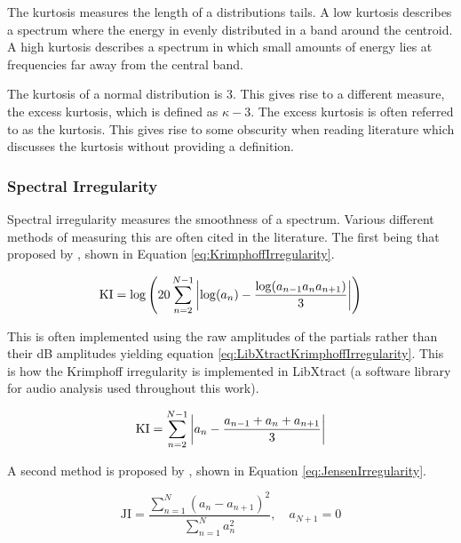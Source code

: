 			The kurtosis measures the length of a distributions tails. A low kurtosis describes a spectrum where
			the energy in evenly distributed in a band around the centroid. A high kurtosis describes a spectrum
			in which small amounts of energy lies at frequencies far away from the central band.

			The kurtosis of a normal distribution is 3. This gives rise to a different measure, the excess
			kurtosis, which is defined as $\kappa - 3$. The excess kurtosis is often referred to as the
			kurtosis. This gives rise to some obscurity when reading literature which discusses the kurtosis
			without providing a definition.

		\subsubsection*{Spectral Irregularity}
			Spectral irregularity measures the smoothness of a spectrum. Various different methods of measuring
			this are often cited in the literature. The first being that proposed by
			\citet{krimphoff1994caracterisation}, shown in Equation \ref{eq:KrimphoffIrregularity}.

			\begin{equation}
				\textrm{KI} = \log \left( 20 \sum_{n = 2}^{N - 1}
							  \left|\log(a_{n}) - \frac{\log(a_{n-1}a_{n}a_{n+1})}{3}\right|
						   \right)
				\label{eq:KrimphoffIrregularity}
			\end{equation}

			This is often implemented using the raw amplitudes of the partials rather than their dB amplitudes
			yielding equation \ref{eq:LibXtractKrimphoffIrregularity}. This is how the Krimphoff irregularity is
			implemented in LibXtract \citep{bullock2007libxtract} (a software library for audio analysis used
			throughout this work).

			\begin{equation}
				\textrm{KI} = \sum_{n = 2}^{N - 1}
						  \left|a_{n} - \frac{a_{n-1} + a_{n} + a_{n+1}}{3}\right|
				\label{eq:LibXtractKrimphoffIrregularity}
			\end{equation}

			A second method is proposed by \citet{jensen1999timbre}, shown in Equation
			\ref{eq:JensenIrregularity}.

			\begin{equation}
				\textrm{JI} = \frac{\sum_{n = 1}^{N} (a_{n} - a_{n+1})^{2}}
						   {\sum_{n = 1}^{N} a_{n}^{2}},
					      \quad a_{N+1} = 0
				\label{eq:JensenIrregularity}
			\end{equation}

